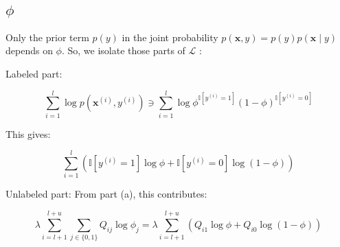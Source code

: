 \documentclass[lang=cn,11pt]{elegantbook}
\begin{document}
\subsection{$\phi$}

Only the prior term $p(y)$ in the joint probability $p(\mathbf{x}, y)=p(y) p(\mathbf{x} \mid y)$ depends on $\phi$. So, we isolate those parts of $\mathcal{L}$ :

Labeled part:

$$
\sum_{i=1}^l \log p\left(\mathbf{x}^{(i)}, y^{(i)}\right) \ni \sum_{i=1}^l \log \phi^{\mathbb{I}\left[y^{(i)}=1\right]}(1-\phi)^{\mathbb{I}\left[y^{(i)}=0\right]}
$$


This gives:

$$
\sum_{i=1}^l\left(\mathbb{I}\left[y^{(i)}=1\right] \log \phi+\mathbb{I}\left[y^{(i)}=0\right] \log (1-\phi)\right)
$$


Unlabeled part:
From part (a), this contributes:

$$
\lambda \sum_{i=l+1}^{l+u} \sum_{j \in\{0,1\}} Q_{i j} \log \phi_j=\lambda \sum_{i=l+1}^{l+u}\left(Q_{i 1} \log \phi+Q_{i 0} \log (1-\phi)\right)
$$
\end{document}
